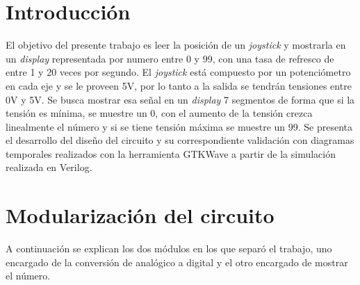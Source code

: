 \documentclass[11pt, a4paper]{article}
\begin{document}


\setcounter{tocdepth}{2}
\tableofcontents
\newpage
%
\section{Introducci\'on}
El objetivo del presente trabajo es leer la posici\'on de un \textit{joystick} y mostrarla en un \textit{display} representada por numero entre 0 y 99, con una tasa de refresco de entre 1 y 20 veces por segundo. 
El \textit{joystick} est\'a compuesto por un potenci\'ometro en cada eje y se le proveen 5V, por lo tanto a la salida se tendr\'an tensiones entre 0V y 5V. Se busca mostrar esa se\~nal en un \textit{display} 7 segmentos de forma que si la tensi\'on es m\'inima, se muestre un 0, con el aumento de la tensi\'on crezca linealmente el n\'umero y si se tiene tensi\'on m\'axima se muestre un 99.
Se presenta el desarrollo del diseño del circuito y su correspondiente validaci\'on con diagramas temporales realizados con la herramienta GTKWave a partir de la simulaci\'on realizada en Verilog.
\newpage

\section{Modularizaci\'on del circuito}
%
A continuaci\'on se explican los dos m\'odulos en los que separ\'o el trabajo, uno encargado de la conversi\'on de anal\'ogico a digital y el otro encargado de mostrar el n\'umero.
\end{document}

